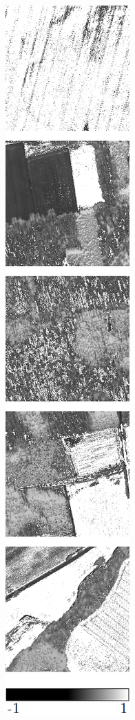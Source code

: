 \begin{figure}[h]
\begin{subfigure}{\VegetationImageWidth}
        \caption{}
        \label{fig:svi_rvi}
    \end{subfigure} \hspace{2mm}
    \begin{subfigure}{\VegetationImageWidth}
        \includegraphics[width=\textwidth]{images/vegetation/ndvi}

\end{subfigure}
\end{figure}
